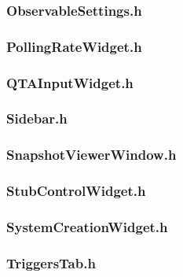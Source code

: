 \subsubsection*{ObservableSettings.h}


\subsubsection*{PollingRateWidget.h}


\subsubsection*{QTAInputWidget.h}


\subsubsection*{Sidebar.h}


\subsubsection*{SnapshotViewerWindow.h}


\subsubsection*{StubControlWidget.h}


\subsubsection*{SystemCreationWidget.h}


\subsubsection*{TriggersTab.h}


